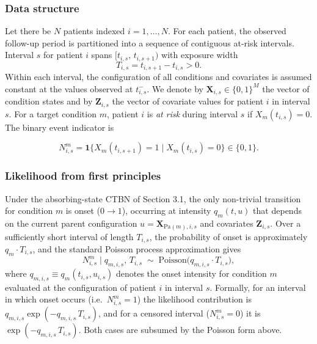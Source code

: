 \documentclass[12pt]{article}
\begin{document}
\subsubsection{Data structure} Let there be $N$ patients indexed $i = 1, \dots, N$. For each patient, the observed follow-up period is partitioned into a sequence of contiguous at-risk intervals. Interval $s$ for patient $i$ spans $[t_{i,s},\, t_{i,s+1})$ with exposure width
\[
T_{i,s} = t_{i,s+1} - t_{i,s} > 0.
\]
Within each interval, the configuration of all conditions and covariates is assumed constant at the values observed at $t_{i,s}^-$. We denote by $\mathbf{X}_{i,s} \in \{0,1\}^M$ the vector of condition states and by $\mathbf{Z}_{i,s}$ the vector of covariate values for patient $i$ in interval $s$. For a target condition $m$, patient $i$ is \emph{at risk} during interval $s$ if $X_m(t_{i,s}) = 0$. The binary event indicator is

\begin{equation}
N^m_{i,s} = \mathbf{1}\{X_m(t_{i,s+1}) = 1 \mid X_m(t_{i,s}) = 0\} \in \{0, 1\}.
\end{equation}

\subsubsection{Likelihood from first principles} Under the absorbing-state CTBN of Section 3.1, the only non-trivial transition for condition $m$ is onset ($0 \to 1$), occurring at intensity $q_m(t, u)$ that depends on the current parent configuration $u = \mathbf{X}_{\mathrm{Pa}(m), i,s}$ and covariates $\mathbf{Z}_{i,s}$. Over a sufficiently short interval of length $T_{i,s}$, the probability of onset is approximately $q_m \cdot T_{i,s}$, and the standard Poisson process approximation \citep{CoxMiller1965} gives
\begin{equation}
N^m_{i,s} \mid q_{m,i,s},\, T_{i,s} \;\sim\; \mathrm{Poisson}\!\bigl(q_{m,i,s} \cdot T_{i,s}\bigr),
\end{equation}
where $q_{m,i,s} \equiv q_m(t_{i,s}, u_{i,s})$ denotes the onset intensity for condition $m$ evaluated at the configuration of patient $i$ in interval $s$. Formally, for an interval in which onset occurs (i.e.\ $N^m_{i,s} = 1$) the likelihood contribution is $q_{m,i,s} \exp(-q_{m,i,s}\, T_{i,s})$, and for a censored interval ($N^m_{i,s} = 0$) it is $\exp(-q_{m,i,s}\, T_{i,s})$. Both cases are subsumed by the Poisson form above.
\end{document}
